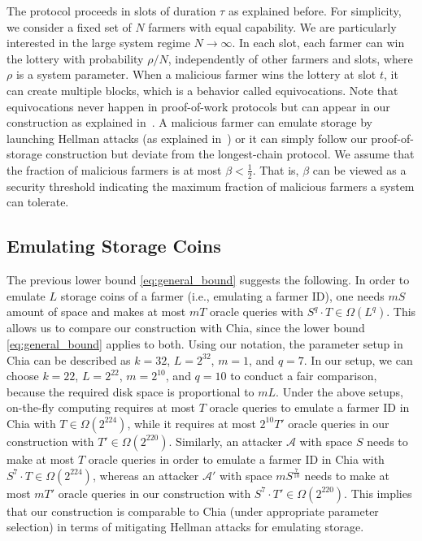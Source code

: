 \documentclass[conference]{IEEEtran}
\begin{document}
The protocol proceeds in slots of duration $\tau$ as explained before. For simplicity, we consider a fixed set of $N$ farmers with equal capability. We
are particularly interested in the large system regime $N \to \infty$. In each slot, each farmer can win the lottery with probability $\rho / N$,
independently of other farmers and slots, where $\rho$ is a system parameter. When a malicious farmer wins the lottery at slot $t$, it can create multiple blocks, which is a behavior called equivocations. Note that equivocations never happen in proof-of-work protocols but can appear in our construction as explained in~\cite{blockchain_capacity}. 
A malicious farmer can emulate storage by launching Hellman attacks (as explained in~\cite{beyond_hellman}) or it can simply follow our proof-of-storage construction but deviate from the longest-chain protocol.
We assume that the fraction of malicious farmers is at most $\beta < \frac{1}{2}$. That is, $\beta$ can be viewed as a security threshold indicating the maximum fraction of malicious farmers a system can tolerate.

\subsection{Emulating Storage Coins}

The previous lower bound \eqref{eq:general_bound} suggests the following. In order to emulate $L$ storage coins of a farmer (i.e., emulating a farmer ID), one needs $mS$
amount of space and makes at most $mT$ oracle queries with $S^q \cdot T \in \Omega\left(L^q \right)$. 
This allows us to compare our construction with Chia, since the lower bound \eqref{eq:general_bound} applies to both.
Using our notation, the parameter setup in Chia can be described as $k = 32$, $L = 2^{32}$, $m = 1$, and $q = 7$. 
In our setup, we can choose $k = 22$, $L = 2^{22}$, $m = 2^{10}$, and $q = 10$ to conduct a fair comparison, 
because the required disk space is proportional to $m L$.
Under the above setups, on-the-fly computing requires at most $T$ oracle queries to emulate a farmer ID in Chia with $T \in \Omega\left( 2^{224} \right)$,
while it requires at most $2^{10} T'$ oracle queries in our construction with $T' \in \Omega\left( 2^{220} \right)$. 
Similarly, an attacker $\mathcal{A}$ with space $S$ needs to make at most $T$
oracle queries in order to emulate  a farmer ID in Chia with $S^7 \cdot T \in \Omega\left( 2^{224}  \right)$, whereas an attacker $\mathcal{A}'$ with space $m {S}^{\frac{7}{10}}$
needs to make at most $m T'$ oracle queries in our construction with $S^7 \cdot T' \in \Omega\left( 2^{220}  \right)$.
This implies that our construction is comparable to Chia (under appropriate parameter selection) in terms of mitigating Hellman attacks for emulating storage.
\end{document}
